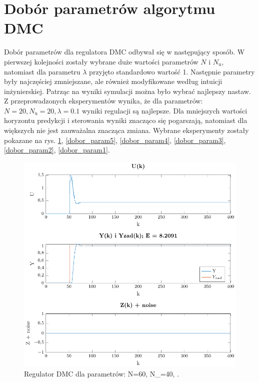 \documentclass[a4paper,titlepage,11pt,twosides,floatssmall]{mwrep}
\begin{document}
\section{Dobór parametrów algorytmu DMC}
Dobór parametrów dla regulatora DMC odbywał się w następujący sposób. W pierwszej kolejności zostały wybrane duże wartości parametrów $N$ i $N_{\mathrm{u}}$, natomiast dla parametru $\lambda$ przyjęto standardowo wartość 1. Następnie parametry były najczęściej zmniejszane, ale również modyfikowane według intuicji inżynierskiej. Patrząc na wyniki symulacji można było wybrać najlepszy nastaw. Z przeprowadzonych eksperymentów wynika, że dla parametrów: $N=20, N_{\mathrm{u}}=20, \lambda=0.1$ wyniki regulacji są najlepsze. Dla mniejszych wartości horyzontu predykcji i sterowania wyniki znacząco się pogarszają, natomiast dla większych nie jest zauważalna znacząca zmiana. Wybrane eksperymenty zostały pokazane na rys. \ref{dobor_param6}, \ref{dobor_param5}, \ref{dobor_param4}, \ref{dobor_param3}, \ref{dobor_param2}, \ref{dobor_param1}.


\begin{figure}[H]
	\centering
	\includegraphics[scale=0.85]{../../Lab2/PDF_rysunki/Z4_DMCParametryN_60_Nu_40_lam_1.pdf}
	\caption{Regulator DMC dla parametrów: N=60, N_{}=40, .}
	\label{dobor_param6}
\end{figure}
\end{document}
